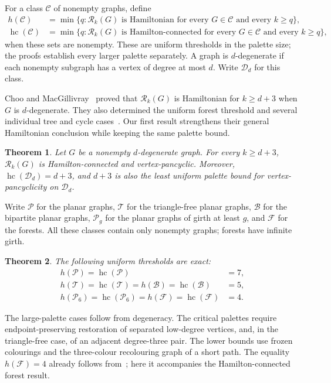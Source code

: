 \documentclass[11pt]{article}
\newtheorem{theorem}{Theorem}[section]
\theoremstyle{remark}
\newcommand{\Rk}{\mathcal R_k}
\newcommand{\hc}{\operatorname{hc}}
\numberwithin{equation}{section}
\numberwithin{table}{section}
\begin{document}
For a class $\mathcal C$ of nonempty graphs, define
\begin{align*}
 h(\mathcal C)&=\min\{q:\Rk(G)\text{ is Hamiltonian for every }G\in\mathcal C
                      \text{ and every }k\ge q\},\\
 \hc(\mathcal C)&=\min\{q:\Rk(G)\text{ is Hamilton-connected for every }G\in\mathcal C
                      \text{ and every }k\ge q\},
\end{align*}
when these sets are nonempty. These are uniform thresholds in the
palette size; the proofs establish every larger palette separately.
A graph is $d$-degenerate if each nonempty subgraph has a vertex of
degree at most $d$. Write $\mathcal D_d$ for this class.

Choo and MacGillivray~\cite[Theorem~3.4]{ChMa11} proved that
$\Rk(G)$ is Hamiltonian for $k\ge d+3$ when $G$ is $d$-degenerate.
They also determined the uniform forest threshold and several
individual tree and cycle cases~\cite[Sections~5--6]{ChMa11}.
Our first result strengthens their general Hamiltonian conclusion
while keeping the same palette bound.

\begin{theorem}\label{thm:main-degenerate}
Let $G$ be a nonempty $d$-degenerate graph. For every $k\ge d+3$,
$\Rk(G)$ is Hamilton-connected and vertex-pancyclic. Moreover,
$\hc(\mathcal D_d)=d+3$, and $d+3$ is also the least uniform palette
bound for vertex-pancyclicity on $\mathcal D_d$.
\end{theorem}

Write $\mathcal P$ for the planar graphs, $\mathcal T$ for the
triangle-free planar graphs, $\mathcal B$ for the bipartite planar
graphs, $\mathcal P_g$ for the planar graphs of girth at least $g$,
and $\mathcal F$ for the forests. All these classes contain only
nonempty graphs; forests have infinite girth.

\begin{theorem}\label{thm:main-planar}
The following uniform thresholds are exact:
\[
\begin{aligned}
 h(\mathcal P)=\hc(\mathcal P)&=7,\\
 h(\mathcal T)=\hc(\mathcal T)=h(\mathcal B)=\hc(\mathcal B)&=5,\\
 h(\mathcal P_6)=\hc(\mathcal P_6)=h(\mathcal F)=\hc(\mathcal F)&=4.
\end{aligned}
\]
\end{theorem}

The large-palette cases follow from degeneracy. The critical palettes
require endpoint-preserving restoration of separated low-degree
vertices, and, in the triangle-free case, of an adjacent degree-three
pair. The lower bounds use frozen colourings and the three-colour
recolouring graph of a short path. The equality $h(\mathcal F)=4$
already follows from~\cite{ChMa11}; here it accompanies the
Hamilton-connected forest result.
\end{document}
